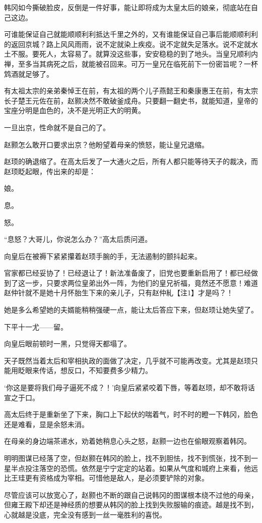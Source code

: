韩冈如今撕破脸皮，反倒是一件好事，能让即将成为太皇太后的娘亲，彻底站在自己这边。

可谁能保证自己就能顺顺利利抵达千里之外的，又有谁能保证自己事后能顺顺利利的返回京城？路上风风雨雨，说不定就染上疾疫。说不定就失足落水。说不定就水土不服。要死人，太容易了。就算没这些事，安安稳稳的到了地头。当皇兄顺利内禅，至多当其病死之后，就能被召回来。可万一皇兄在临死前下一份密旨呢？一杯鸩酒就足够了。

有太祖太宗的亲弟秦悼王在前，有太祖的两个儿子燕懿王和秦康惠王在前，有太宗长子楚王元佐在前，赵颢决然不敢破釜成舟。只要翻一翻史书，就能知道，皇帝的宝座分明是血色的，决不是光明正大的明黄。

一旦出京，性命就不是自己的了。

赵颢怎么敢开口要求出京？他盼望着母亲的愤怒，能让皇兄退缩。

赵顼的确退缩了。在高太后发了一大通火之后，所有人都只能等待天子的裁决，而赵顼眨起眼，传出来的却是：

娘。

息。

怒。

“息怒？大哥儿，你说怎么办？”高太后质问道。

向皇后在被褥下紧紧攥着赵顼手腕的手，无法遏制的颤抖起来。

官家都已经妥协了！已经退让了！新法准备废了，旧党也要重新启用了！都已经做到了这一步，只要求两位皇弟出外一阵，为他们的皇兄祈福，竟然还不愿意！难道赵仲针就不是她十月怀胎生下来的亲儿子，只有赵仲糺【注1】才是吗？！

她是多么希望她的夫婿能稍稍强硬一点，能让太后答应下来，但赵顼让她失望了。

下平十一尤——留。

向皇后眼前顿时一黑，只觉得天都塌了。

天子既然当着太后和宰相执政的面做了决定，几乎就不可能再改变。尤其是赵顼只能用眨眼来传话，想反口，不知要费多少精力。

‘你这是要将我们母子逼死不成？！’向皇后紧紧咬着下唇，等着赵顼，却不敢将话宣之于口。

高太后终于是重新坐了下来，胸口上下起伏的喘着气，时不时的瞪一下韩冈，脸色还是难看，显是余怒未消。

在母亲的身边端茶递水，劝着她稍息心头之怒，赵颢一边也在偷眼观察着韩冈。

明明图谋已经落了空，但赵颢在韩冈的脸上，找不到胆怯，找不到慌张，找不到一星半点投注落空的恐慌。依然是宁宁定定的站着。如果从气度和城府上来看，他远比王珪更有资格成为宰相。可惜他是敌人，是必须要铲除的对象。

尽管应该可以放宽心了，赵颢也不断的跟自己说韩冈的图谋根本绕不过他的母亲，但雍王殿下却还是神经质的想要从韩冈的脸上找到失败服输的痕迹。越是找不到，心就越是没底，完全没有感到一丝一毫胜利的喜悦。

